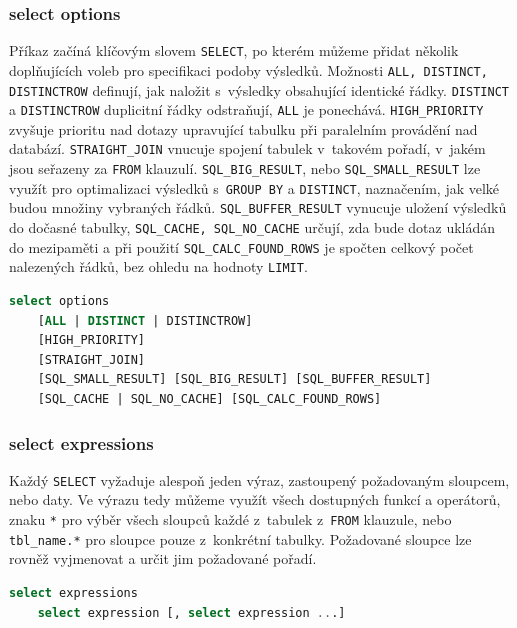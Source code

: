 \subsubsection{select options} \label{subsubsec:6:selectopt}
Příkaz začíná klíčovým slovem \texttt{SELECT}, po kterém můžeme přidat několik doplňujících voleb pro specifikaci podoby výsledků.
Možnosti \texttt{ALL, DISTINCT, DISTINCTROW} definují, jak naložit s~výsledky obsahující identické řádky. 
\texttt{DISTINCT} a \texttt{DISTINCTROW} duplicitní řádky odstraňují, \texttt{ALL} je ponechává. 
\texttt{HIGH\_PRIORITY} zvyšuje prioritu nad dotazy upravující tabulku při paralelním provádění nad databází.
\texttt{STRAIGHT\_JOIN} vnucuje spojení tabulek v~takovém pořadí, v~jakém jsou seřazeny za \texttt{FROM} klauzulí.
\texttt{SQL\_BIG\_RESULT}, nebo \texttt{SQL\_SMALL\_RESULT} lze využít pro optimalizaci výsledků s~\texttt{GROUP BY}
a \texttt{DISTINCT}, naznačením, jak velké budou množiny vybraných řádků.
\texttt{SQL\_BUFFER\_RESULT} vynucuje uložení výsledků do dočasné tabulky, \texttt{SQL\_CACHE, SQL\_NO\_CACHE} určují,
zda bude dotaz ukládán do mezipaměti a při použití \texttt{SQL\_CALC\_FOUND\_ROWS} 
je spočten celkový počet nalezených řádků, bez ohledu na hodnoty \texttt{LIMIT}.

\begin{lstlisting}[language=sql]
select options
    [ALL | DISTINCT | DISTINCTROW]
    [HIGH_PRIORITY]
    [STRAIGHT_JOIN]
    [SQL_SMALL_RESULT] [SQL_BIG_RESULT] [SQL_BUFFER_RESULT]
    [SQL_CACHE | SQL_NO_CACHE] [SQL_CALC_FOUND_ROWS]
\end{lstlisting}

\subsubsection{select expressions} \label{subsubsec:6:selectepr}
Každý \texttt{SELECT} vyžaduje alespoň jeden výraz, zastoupený požadovaným sloupcem, nebo daty. Ve výrazu tedy můžeme využít všech 
dostupných funkcí a operátorů, znaku \texttt{*} pro výběr všech sloupců každé z~tabulek z~\texttt{FROM} klauzule, nebo \texttt{tbl\_name.*}
pro sloupce pouze z~konkrétní tabulky. Požadované sloupce lze rovněž vyjmenovat a určit jim požadované pořadí. 

\begin{lstlisting}[language=sql]
select expressions
    select expression [, select expression ...]
\end{lstlisting}


